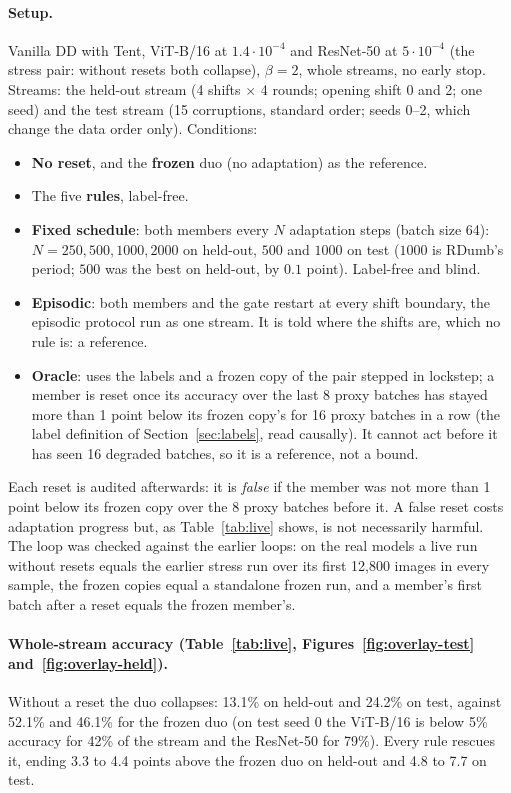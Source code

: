 \documentclass[10pt]{article}
\newcommand{\vit}{ViT-B/16}
\newcommand{\rn}{ResNet-50}
\begin{document}
\paragraph{Setup.} Vanilla DD with Tent, \vit{} at $1.4{\cdot}10^{-4}$ and \rn{} at $5{\cdot}10^{-4}$ (the stress pair: without resets both collapse), $\beta = 2$, whole streams, no early stop. Streams: the held-out stream (4 shifts $\times$ 4 rounds; opening shift 0 and 2; one seed) and the test stream (15 corruptions, standard order; seeds 0--2, which change the data order only). Conditions:
\begin{itemize}
  \item \textbf{No reset}, and the \textbf{frozen} duo (no adaptation) as the reference.
  \item The five \textbf{rules}, label-free.
  \item \textbf{Fixed schedule}: both members every $N$ adaptation steps (batch size 64): $N = 250, 500, 1000, 2000$ on held-out, $500$ and $1000$ on test ($1000$ is RDumb's period; $500$ was the best on held-out, by $0.1$ point). Label-free and blind.
  \item \textbf{Episodic}: both members and the gate restart at every shift boundary, the episodic protocol run as one stream. It is told where the shifts are, which no rule is: a reference.
  \item \textbf{Oracle}: uses the labels and a frozen copy of the pair stepped in lockstep; a member is reset once its accuracy over the last 8 proxy batches has stayed more than 1 point below its frozen copy's for 16 proxy batches in a row (the label definition of Section~\ref{sec:labels}, read causally). It cannot act before it has seen 16 degraded batches, so it is a reference, not a bound.
\end{itemize}
Each reset is audited afterwards: it is \emph{false} if the member was not more than 1 point below its frozen copy over the 8 proxy batches before it. A false reset costs adaptation progress but, as Table~\ref{tab:live} shows, is not necessarily harmful.
The loop was checked against the earlier loops: on the real models a live run without resets equals the earlier stress run over its first 12,800 images in every sample, the frozen copies equal a standalone frozen run, and a member's first batch after a reset equals the frozen member's.

\paragraph{Whole-stream accuracy (Table~\ref{tab:live}, Figures~\ref{fig:overlay-test} and~\ref{fig:overlay-held}).} Without a reset the duo collapses: 13.1\% on held-out and 24.2\% on test, against 52.1\% and 46.1\% for the frozen duo (on test seed 0 the \vit{} is below 5\% accuracy for 42\% of the stream and the \rn{} for 79\%). Every rule rescues it, ending 3.3 to 4.4 points above the frozen duo on held-out and 4.8 to 7.7 on test.
\end{document}
